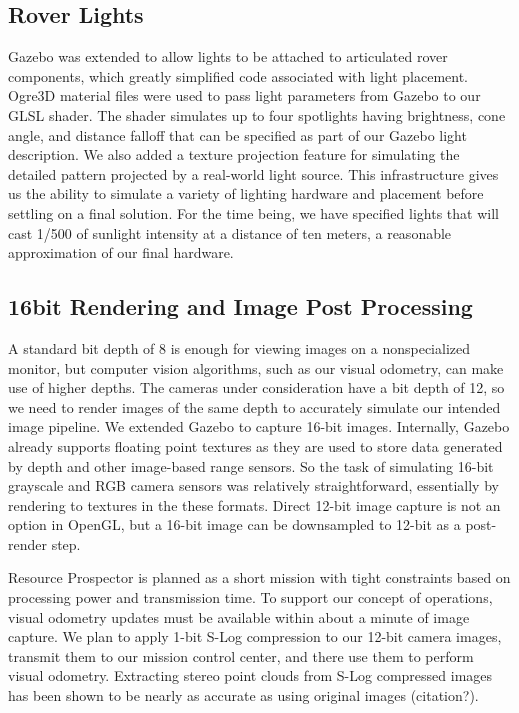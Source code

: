 \documentclass[twocolumn,letterpaper]{IEEEAerospaceCLS}  %
\begin{document}
\subsection{Rover Lights}
Gazebo was extended to allow lights to be attached to articulated rover components, which greatly simplified code associated with light placement. 
Ogre3D material files were used to pass light parameters from Gazebo to our GLSL shader. 
The shader simulates up to four spotlights having brightness, cone angle, and distance falloff that can be specified as part of our Gazebo light description.
We also added a texture projection feature for simulating the detailed pattern projected by a real-world light source. 
This infrastructure gives us the ability to simulate a variety of lighting hardware and placement before settling on a final solution. 
For the time being, we have specified lights that will cast 1/500 of sunlight intensity at a distance of ten meters, a reasonable approximation of our final hardware.

\subsection{16bit Rendering and Image Post Processing}
A standard bit depth of 8 is enough for viewing images on a nonspecialized monitor, but computer vision algorithms, such as our visual odometry, can make use of higher depths. 
The cameras under consideration have a bit depth of 12, so we need to render images of the same depth to accurately simulate our intended image pipeline. 
We extended Gazebo to capture 16-bit images. 
Internally, Gazebo already supports floating point textures as they are used to store data generated by depth and other image-based range sensors. So the task of simulating 16-bit grayscale and RGB camera sensors was relatively straightforward, essentially by rendering to textures in the these formats. 
Direct 12-bit image capture is not an option in OpenGL, but a 16-bit image can be downsampled to 12-bit as a post-render step.

Resource Prospector is planned as a short mission with tight constraints based on processing power and transmission time. 
To support our concept of operations, visual odometry updates must be available within about a minute of image capture. 
We plan to apply 1-bit S-Log compression to our 12-bit camera images, transmit them to our mission control center, and there use them to perform visual odometry. 
Extracting stereo point clouds from S-Log compressed images has been shown to be nearly as accurate as using original images (citation?).
\end{document}
